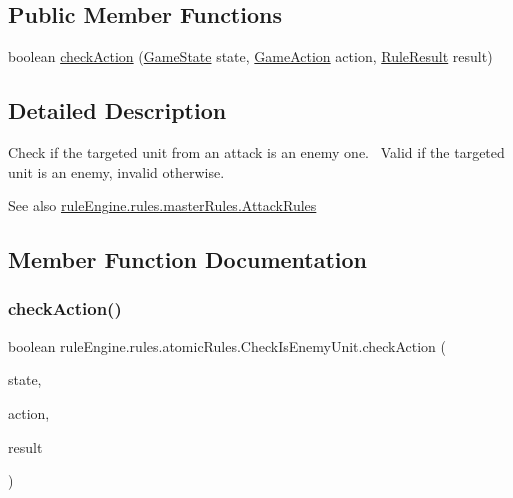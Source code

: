 \subsection*{Public Member Functions}
\begin{DoxyCompactItemize}
\item 
boolean \mbox{\hyperlink{classrule_engine_1_1rules_1_1atomic_rules_1_1_check_is_enemy_unit_a0f5a8e1e1d38431310489f7c6bdb9776}{check\+Action}} (\mbox{\hyperlink{classgame_1_1game_state_1_1_game_state}{Game\+State}} state, \mbox{\hyperlink{classrule_engine_1_1_game_action}{Game\+Action}} action, \mbox{\hyperlink{classrule_engine_1_1_rule_result}{Rule\+Result}} result)
\end{DoxyCompactItemize}


\subsection{Detailed Description}
Check if the targeted unit from an attack is an enemy one.~\newline
 Valid if the targeted unit is an enemy, invalid otherwise.

\begin{DoxySeeAlso}{See also}
\mbox{\hyperlink{classrule_engine_1_1rules_1_1master_rules_1_1_attack_rules}{rule\+Engine.\+rules.\+master\+Rules.\+Attack\+Rules}} 
\end{DoxySeeAlso}


\subsection{Member Function Documentation}
\mbox{\label{classrule_engine_1_1rules_1_1atomic_rules_1_1_check_is_enemy_unit_a0f5a8e1e1d38431310489f7c6bdb9776}} 
\subsubsection{\texorpdfstring{check\+Action()}{checkAction()}}
{\footnotesize\ttfamily boolean rule\+Engine.\+rules.\+atomic\+Rules.\+Check\+Is\+Enemy\+Unit.\+check\+Action (\begin{DoxyParamCaption}\item[{\mbox{\hyperlink{classgame_1_1game_state_1_1_game_state}{Game\+State}}}]{state,  }\item[{\mbox{\hyperlink{classrule_engine_1_1_game_action}{Game\+Action}}}]{action,  }\item[{\mbox{\hyperlink{classrule_engine_1_1_rule_result}{Rule\+Result}}}]{result }\end{DoxyParamCaption})\hspace{0.3cm}{\ttfamily [inline]}}



